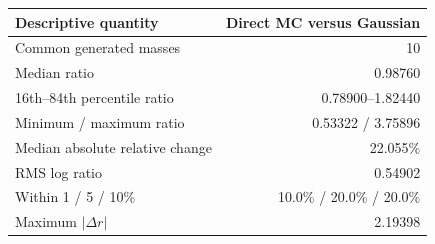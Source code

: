 \begin{tabular}{lr}
\toprule
Descriptive quantity & Direct MC versus Gaussian \\
\midrule
Common generated masses & 10 \\
Median ratio & 0.98760 \\
16th--84th percentile ratio & 0.78900--1.82440 \\
Minimum / maximum ratio & 0.53322 / 3.75896 \\
Median absolute relative change & 22.055\% \\
RMS log ratio & 0.54902 \\
Within 1 / 5 / 10\% & 10.0\% / 20.0\% / 20.0\% \\
Maximum $|\Delta r|$ & 2.19398 \\
\bottomrule
\end{tabular}
